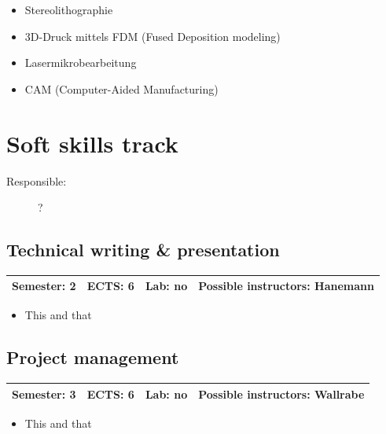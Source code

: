 \documentclass[12pt,twoside,fleqn,a4paper]{article}
\begin{document}
\begin{itemize}
\setlength\itemsep{0cm}
\item Stereolithographie
\item 3D-Druck mittels FDM (Fused Deposition modeling)
\item Lasermikrobearbeitung
\item CAM (Computer-Aided Manufacturing)

\end{itemize}


\newpage
\section{Soft skills track}
\begin{description}
\item[Responsible:] ?
\end{description}
\vspace{1 mm}


\subsection{Technical writing \& presentation}
\begin{tabular}{llll} \hline
\textbf{Semester:} 2 & \textbf{ECTS:} 6 & \textbf{Lab:} no & \textbf{Possible instructors:} Hanemann\\
\hline
\end{tabular}

\begin{itemize}
\setlength\itemsep{0cm}
\item This and that
\end{itemize}


\subsection{Project management}
\begin{tabular}{llll} \hline
\textbf{Semester:} 3 & \textbf{ECTS:} 6 & \textbf{Lab:} no & \textbf{Possible instructors:} Wallrabe\\
\hline
\end{tabular}

\begin{itemize}
\setlength\itemsep{0cm}
\item This and that
\end{itemize}


\end{document}
